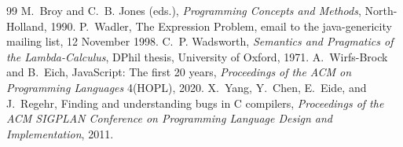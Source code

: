 \documentclass[11pt]{article}
\theoremstyle{definition}
\theoremstyle{remark}
\begin{document}
\begin{thebibliography}{99}
  M.~Broy and C.~B. Jones (eds.), \emph{Programming Concepts and Methods},
  North-Holland, 1990.
   P.~Wadler, The Expression Problem, email to the
  java-genericity mailing list, 12 November 1998.
   C.~P. Wadsworth, \emph{Semantics and Pragmatics of
  the Lambda-Calculus}, DPhil thesis, University of Oxford, 1971.
   A.~Wirfs-Brock and B.~Eich, JavaScript: The first 20 years,
  \emph{Proceedings of the ACM on Programming Languages} 4(HOPL), 2020.
   X.~Yang, Y.~Chen, E.~Eide, and J.~Regehr, Finding and
  understanding bugs in C compilers, \emph{Proceedings of the ACM SIGPLAN
  Conference on Programming Language Design and Implementation}, 2011.
\end{thebibliography}
\end{document}
